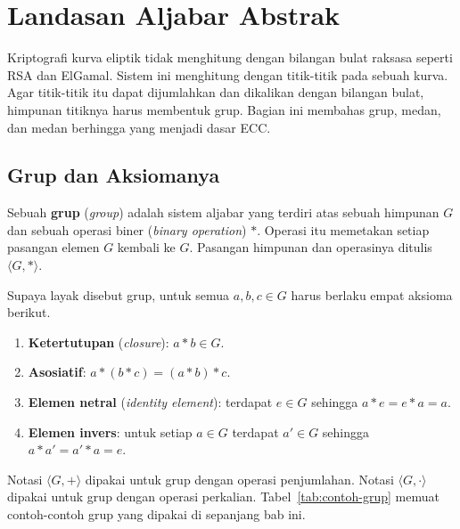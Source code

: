 \section{Landasan Aljabar Abstrak}
\label{sec:aljabar-abstrak}

Kriptografi kurva eliptik tidak menghitung dengan bilangan bulat raksasa seperti
RSA dan ElGamal. Sistem ini menghitung dengan titik-titik pada sebuah kurva.
Agar titik-titik itu dapat dijumlahkan dan dikalikan dengan bilangan bulat,
himpunan titiknya harus membentuk grup. Bagian ini membahas grup, medan, dan
medan berhingga yang menjadi dasar ECC.


\subsection{Grup dan Aksiomanya}
\label{subsec:grup}

Sebuah \textbf{grup} (\textit{group}) adalah sistem aljabar yang terdiri atas
sebuah himpunan $G$ dan sebuah operasi biner (\textit{binary operation}) $*$. Operasi itu memetakan setiap
pasangan elemen $G$ kembali ke $G$. Pasangan himpunan dan operasinya ditulis
$\langle G, * \rangle$.

Supaya layak disebut grup, untuk semua $a, b, c \in G$ harus berlaku empat
aksioma berikut.

\begin{enumerate}
    \item \textbf{Ketertutupan} (\textit{closure}): $a * b \in G$.
    \item \textbf{Asosiatif}: $a * (b * c) = (a * b) * c$.
    \item \textbf{Elemen netral} (\textit{identity element}): terdapat $e \in G$
          sehingga $a * e = e * a = a$.
    \item \textbf{Elemen invers}: untuk setiap $a \in G$ terdapat $a' \in G$
          sehingga $a * a' = a' * a = e$.
\end{enumerate}

Notasi $\langle G, + \rangle$ dipakai untuk grup dengan operasi penjumlahan.
Notasi $\langle G, \cdot \rangle$ dipakai untuk grup dengan operasi perkalian.
Tabel~\ref{tab:contoh-grup} memuat contoh-contoh grup yang dipakai di sepanjang
bab ini.

